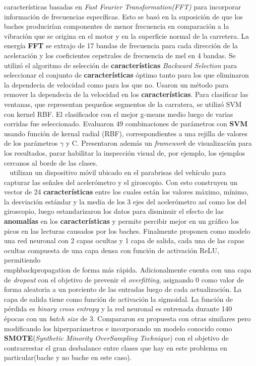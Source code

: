 		características basadas en \emph{Fast Fourier Transformation(FFT)} para incorporar información de frecuencias específicas. Esto se basó en
		la suposición de que los baches producirían componentes de menor frecuencia en comparación a la vibración que se origina en el motor y en
		la superficie normal de la carretera. La energía \textbf{FFT} se extrajo de 17 bandas de frecuencia para cada dirección de la aceleración
		y los coeficientes cepstrales de frecuencia de mel en 4 bandas. Se utilizó el algoritmo de selección de \textbf{características} \emph{Backward
		Selection} para seleccionar el conjunto de \textbf{características} óptimo tanto para los que eliminaron la dependecia de velocidad como para los
		que no. Usaron un método para remover la dependecia de la velocidad en los \textbf{características}. Para clasificar las ventanas, que representan
		pequeños segmentos de la carratera, se utilizó SVM con kernel RBF. El clasificador con el mejor g-means medio luego de varias corridas fue
		seleccionado. Evaluaron 49 combinaciones de parámetros con \textbf{SVM} usando función de kernal radial (RBF), correspondientes a una
		rejilla de valores de los parámetros $\gamma$ y C. Presentaron además un \emph{framework} de visualización para los resultados, parar
		habilitar la inspección visual de, por ejemplo, los ejemplos cercanos al borde de las clases.\\

		~ utilizan un dispositivo móvil ubicado en el parabrisas del vehículo para capturar las señales del acelerómetro y el
		giroscopio. Con esto construyen un vector de 24 \textbf{características} entre los cuales están los valores máximo, mínimo, la desviación estándar
		y la media de los 3 ejes del acelerómetro así como los del giroscopio, luego estandarizaron los datos para disminuir el efecto de las \textbf{anomalías}
		en los \textbf{características} y permite percibir mejor en un gráfico los picos en las lecturas causados por los baches. Finalmente proponen como
		modelo una red neuronal con 2 capas ocultas y 1 capa de salida, cada una de las capas ocultas compuesta de una capa densa con función de activación
		ReLU, permitiendo
		\\emph{backpropagation} de forma más rápida. Adicionalmente cuenta con una capa de \emph{dropout} con el objetivo de prevenir el \emph{overfitting},
		asignando 0 como valor de forma aleatoria a un porciento de las entradas luego de cada actualización. La capa de salida tiene como función de activación
		la sigmoidal. La función de pérdida es \emph{binary cross entropy} y la red neuronal es entrenada durante 140 épocas con un \emph{batch size} de 3.
		Compararon su propuesta con otras similares pero modificando los hiperparámetros e incorporando un modelo conocido como \textbf{SMOTE}(\emph{Synthetic
		Minority OverSampling Technique}) con el objetivo de contrarrestar el gran desbalance entre clases que hay en este problema en particular(bache y no
		bache en este caso).\\

